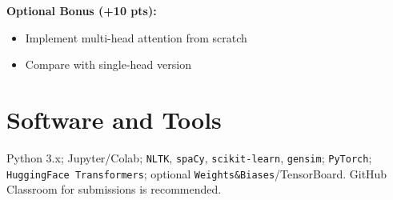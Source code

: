 \documentclass[12pt]{article}
\begin{document}
\begin{enumerate}[leftmargin=1.25em]
    \vspace{0.5em}
    
    \textbf{Optional Bonus (+10 pts):}
    \begin{itemize}
    \item Implement multi-head attention from scratch
    \item Compare with single-head version
    \end{itemize}
  

\end{enumerate}




\section*{Software and Tools}
Python 3.x; Jupyter/Colab; \texttt{NLTK}, \texttt{spaCy}, \texttt{scikit-learn}, \texttt{gensim}; \texttt{PyTorch}; \texttt{HuggingFace Transformers}; optional \texttt{Weights\&Biases}/TensorBoard. GitHub Classroom for submissions is recommended.
\end{document}
